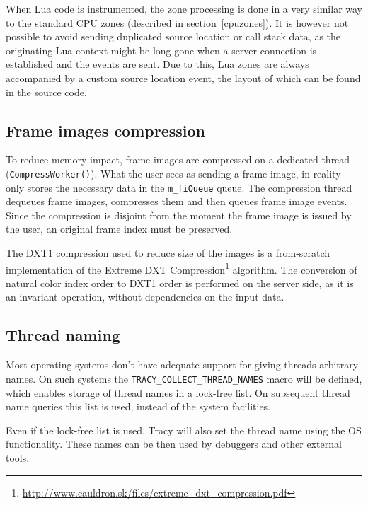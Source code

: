 \documentclass[hidelinks,titlepage,a4paper]{article}
\begin{document}
When Lua code is instrumented, the zone processing is done in a very similar way to the standard CPU zones (described in section~\ref{cpuzones}). It is however not possible to avoid sending duplicated source location or call stack data, as the originating Lua context might be long gone when a server connection is established and the events are sent. Due to this, Lua zones are always accompanied by a custom source location event, the layout of which can be found in the source code.

\subsection{Frame images compression}
\label{fithread}

To reduce memory impact, frame images are compressed on a dedicated thread (\texttt{CompressWorker()}). What the user sees as sending a frame image, in reality only stores the necessary data in the \texttt{m\_fiQueue} queue. The compression thread dequeues frame images, compresses them and then queues frame image events. Since the compression is disjoint from the moment the frame image is issued by the user, an original frame index must be preserved.

The DXT1 compression used to reduce size of the images is a from-scratch implementation of the Extreme DXT Compression\footnote{\url{http://www.cauldron.sk/files/extreme_dxt_compression.pdf}} algorithm. The conversion of natural color index order to DXT1 order is performed on the server side, as it is an invariant operation, without dependencies on the input data.

\subsection{Thread naming}

Most operating systems don't have adequate support for giving threads arbitrary names. On such systems the \texttt{TRACY\_COLLECT\_THREAD\_NAMES} macro will be defined, which enables storage of thread names in a lock-free list. On subsequent thread name queries this list is used, instead of the system facilities.

Even if the lock-free list is used, Tracy will also set the thread name using the OS functionality. These names can be then used by debuggers and other external tools.
\end{document}
